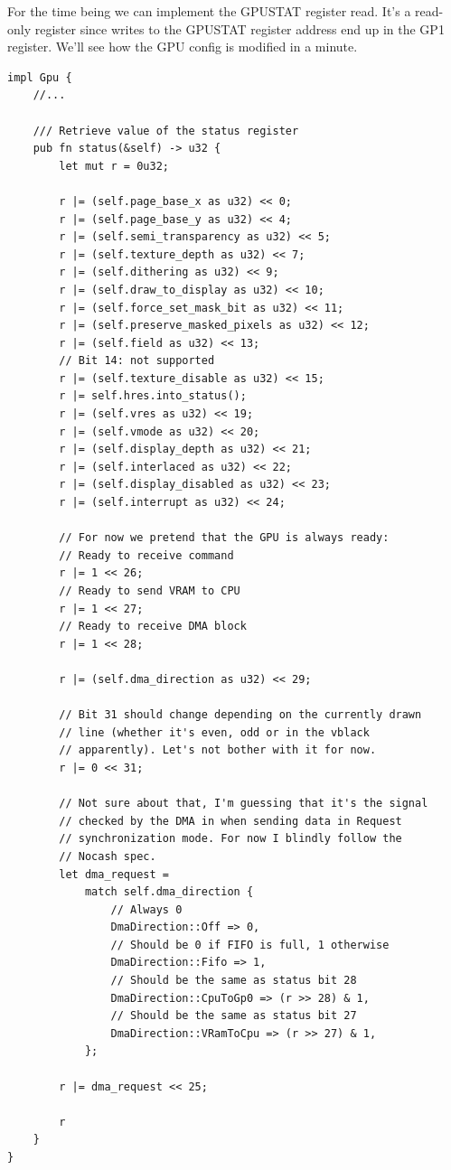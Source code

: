 \documentclass[a4paper]{article}
\begin{document}
For the time being we can implement the GPUSTAT register read. It's a
read-only register since writes to the GPUSTAT register address end up
in the GP1 register. We'll see how the GPU config is modified in a
minute.

\begin{lstlisting}
impl Gpu {
    //...

    /// Retrieve value of the status register
    pub fn status(&self) -> u32 {
        let mut r = 0u32;

        r |= (self.page_base_x as u32) << 0;
        r |= (self.page_base_y as u32) << 4;
        r |= (self.semi_transparency as u32) << 5;
        r |= (self.texture_depth as u32) << 7;
        r |= (self.dithering as u32) << 9;
        r |= (self.draw_to_display as u32) << 10;
        r |= (self.force_set_mask_bit as u32) << 11;
        r |= (self.preserve_masked_pixels as u32) << 12;
        r |= (self.field as u32) << 13;
        // Bit 14: not supported
        r |= (self.texture_disable as u32) << 15;
        r |= self.hres.into_status();
        r |= (self.vres as u32) << 19;
        r |= (self.vmode as u32) << 20;
        r |= (self.display_depth as u32) << 21;
        r |= (self.interlaced as u32) << 22;
        r |= (self.display_disabled as u32) << 23;
        r |= (self.interrupt as u32) << 24;

        // For now we pretend that the GPU is always ready:
        // Ready to receive command
        r |= 1 << 26;
        // Ready to send VRAM to CPU
        r |= 1 << 27;
        // Ready to receive DMA block
        r |= 1 << 28;

        r |= (self.dma_direction as u32) << 29;

        // Bit 31 should change depending on the currently drawn
        // line (whether it's even, odd or in the vblack
        // apparently). Let's not bother with it for now.
        r |= 0 << 31;

        // Not sure about that, I'm guessing that it's the signal
        // checked by the DMA in when sending data in Request
        // synchronization mode. For now I blindly follow the
        // Nocash spec.
        let dma_request =
            match self.dma_direction {
                // Always 0
                DmaDirection::Off => 0,
                // Should be 0 if FIFO is full, 1 otherwise
                DmaDirection::Fifo => 1,
                // Should be the same as status bit 28
                DmaDirection::CpuToGp0 => (r >> 28) & 1,
                // Should be the same as status bit 27
                DmaDirection::VRamToCpu => (r >> 27) & 1,
            };

        r |= dma_request << 25;

        r
    }
}
\end{lstlisting}
\end{document}

